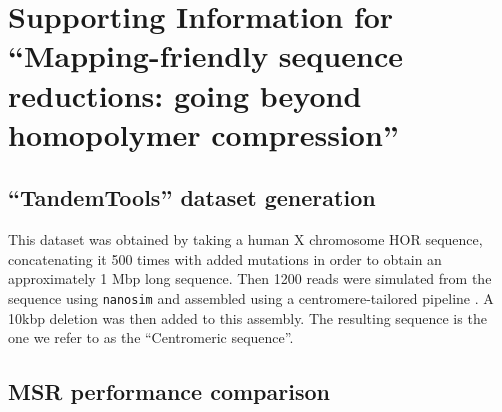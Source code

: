 \documentclass[
  11pt,
  twoside]{scrbook}
\begin{document}
\hypertarget{HPC-appendix}{%
\chapter{Supporting Information for ``Mapping-friendly sequence reductions: going beyond homopolymer compression''}\label{HPC-appendix}}

\hypertarget{appendix:tandemtools}{%
\section{``TandemTools'' dataset generation}\label{appendix:tandemtools}}

This dataset was obtained by taking a human X chromosome HOR sequence, concatenating it 500 times with added mutations in order to obtain an approximately 1 Mbp long sequence. Then 1200 reads were simulated from the sequence using \texttt{nanosim} \autocite{yangNanoSimNanoporeSequence2017} and assembled using a centromere-tailored pipeline \autocite{bzikadzeAutomatedAssemblyCentromeres2020}. A 10kbp deletion was then added to this assembly. The resulting sequence is the one we refer to as the ``Centromeric sequence''.

\hypertarget{msr-performance-comparison}{%
\section{MSR performance comparison}\label{msr-performance-comparison}}
\end{document}
